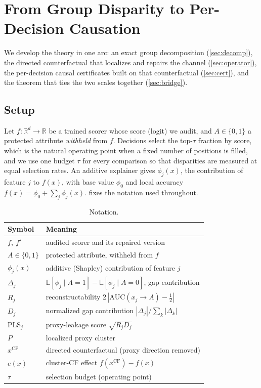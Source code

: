 \documentclass[sn-mathphys-num]{sn-jnl}
\newcommand{\PLS}{\mathrm{PLS}}
\newcommand{\Exp}{\mathbb{E}}
\newcommand{\Real}{\mathbb{R}}
\begin{document}
\section{From Group Disparity to Per-Decision Causation}
\label{sec:theory}

We develop the theory in one arc: an exact group decomposition
(\cref{sec:decomp}), the directed counterfactual that localizes and repairs the
channel (\cref{sec:operator}), the per-decision causal certificates built on that
counterfactual (\cref{sec:cert}), and the theorem that ties the two scales
together (\cref{sec:bridge}).

\subsection{Setup}
Let $f:\Real^d\!\to\!\Real$ be a trained scorer whose score (logit) we audit, and
$A\in\{0,1\}$ a protected attribute \emph{withheld} from $f$. Decisions select the
top-$\tau$ fraction by score, which is the natural operating point when a fixed number of
positions is filled, and we use one budget $\tau$ for every comparison so that
disparities are measured at equal selection rates. An additive explainer gives
$\phi_j(x)$, the contribution of feature $j$ to $f(x)$, with base value $\phi_0$
and local accuracy $f(x)=\phi_0+\sum_j\phi_j(x)$.  fixes the
notation used throughout.

\begin{table}[tbp]
\centering
\caption{Notation.}
\label{tab:notation}
\small
\begin{tabular}{ll}
\toprule
Symbol & Meaning\\
\midrule
$f,\ f'$ & audited scorer and its repaired version\\
$A\in\{0,1\}$ & protected attribute, withheld from $f$\\
$\phi_j(x)$ & additive (Shapley) contribution of feature $j$\\
$\Delta_j$ & $\Exp[\phi_j\mid A{=}1]-\Exp[\phi_j\mid A{=}0]$, gap contribution\\
$R_j$ & reconstructability $2\,|\mathrm{AUC}(x_j\!\to\!A)-\tfrac12|$\\
$D_j$ & normalized gap contribution $|\Delta_j|/\sum_k|\Delta_k|$\\
$\PLS_j$ & proxy-leakage score $\sqrt{R_j D_j}$\\
$P$ & localized proxy cluster\\
$x^{\mathrm{CF}}$ & directed counterfactual (proxy direction removed)\\
$e(x)$ & cluster-CF effect $f(x^{\mathrm{CF}})-f(x)$\\
$\tau$ & selection budget (operating point)\\
\bottomrule
\end{tabular}
\end{table}
\end{document}

